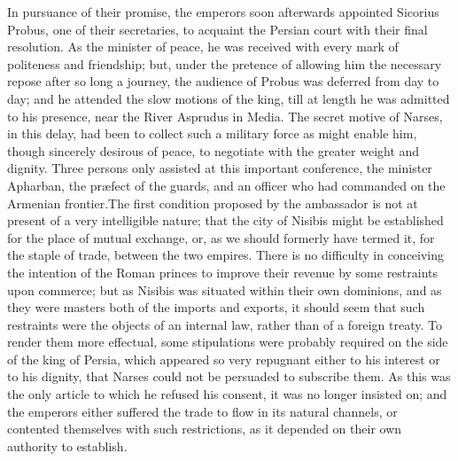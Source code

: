 In pursuance of their promise, the emperors soon afterwards
appointed Sicorius Probus, one of their secretaries, to acquaint
the Persian court with their final resolution. As the minister of
peace, he was received with every mark of politeness and
friendship; but, under the pretence of allowing him the necessary
repose after so long a journey, the audience of Probus was
deferred from day to day; and he attended the slow motions of the
king, till at length he was admitted to his presence, near the
River Asprudus in Media. The secret motive of Narses, in this
delay, had been to collect such a military force as might enable
him, though sincerely desirous of peace, to negotiate with the
greater weight and dignity. Three persons only assisted at this
important conference, the minister Apharban, the præfect of the
guards, and an officer who had commanded on the Armenian
frontier.\footnotemark[76] The first condition proposed by the ambassador is
not at present of a very intelligible nature; that the city of
Nisibis might be established for the place of mutual exchange,
or, as we should formerly have termed it, for the staple of
trade, between the two empires. There is no difficulty in
conceiving the intention of the Roman princes to improve their
revenue by some restraints upon commerce; but as Nisibis was
situated within their own dominions, and as they were masters
both of the imports and exports, it should seem that such
restraints were the objects of an internal law, rather than of a
foreign treaty. To render them more effectual, some stipulations
were probably required on the side of the king of Persia, which
appeared so very repugnant either to his interest or to his
dignity, that Narses could not be persuaded to subscribe them. As
this was the only article to which he refused his consent, it was
no longer insisted on; and the emperors either suffered the trade
to flow in its natural channels, or contented themselves with
such restrictions, as it depended on their own authority to
establish.


